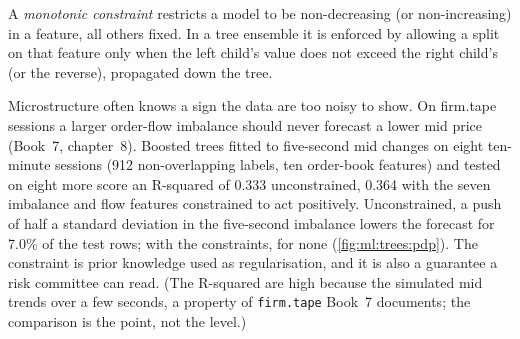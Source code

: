 \begin{definition}\label{def:ml:trees-and-boosting:monotone}
A \emph{monotonic constraint} restricts a model to be non-decreasing (or non-increasing) in a
feature, all others fixed. In a tree ensemble it is enforced by allowing a split on that feature only when the left
child's value does not exceed the right child's (or the reverse), propagated down the tree.
\end{definition}

Microstructure often knows a sign the data are too noisy to show. On firm.tape sessions a larger order-flow imbalance
should never forecast a lower mid price (Book~7, chapter~8). Boosted trees fitted to five-second mid changes on eight
ten-minute sessions (912 non-overlapping labels, ten order-book features) and tested on eight more score an R-squared of
0.333 unconstrained, 0.364 with the seven imbalance and flow features constrained to act positively. Unconstrained, a
push of half a standard deviation in the five-second imbalance lowers the forecast for 7.0\% of the test rows; with the
constraints, for none (\cref{fig:ml:trees:pdp}). The constraint is prior knowledge used as regularisation, and it is also
a guarantee a risk committee can read. (The R-squared are high because the simulated mid trends over a few seconds, a
property of \texttt{firm.tape} Book~7 documents; the comparison is the point, not the level.)

\begin{omfigure}

\label{fig:ml:trees:pdp}
\end{omfigure}

